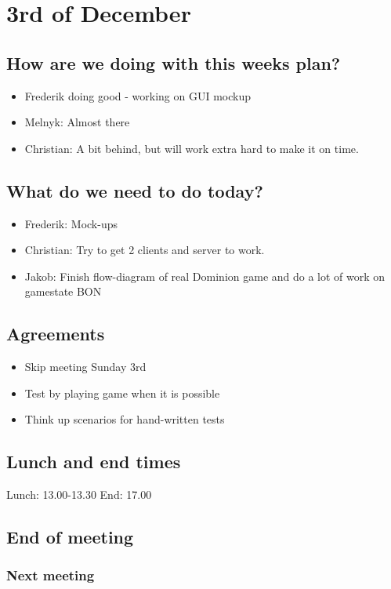 \section{3rd of December}
\subsection{How are we doing with this weeks plan?}
\begin{itemize}
\item  Frederik doing good - working on GUI mockup
\item Melnyk: Almost there
\item Christian: A bit behind, but will work extra hard to make it on time.
\end{itemize}

\subsection{What do we need to do today?}
\begin{itemize}
\item Frederik: Mock-ups
\item Christian: Try to get 2 clients and server to work.
\item Jakob: Finish flow-diagram of real Dominion game and do a lot of work on gamestate BON
\end{itemize}

\subsection{Agreements}
\begin{itemize}
\item Skip meeting Sunday 3rd
\item Test by playing game when it is possible
\item Think up scenarios for hand-written tests
\end{itemize}
\subsection{Lunch and end times}
Lunch:
13.00-13.30
End:
17.00
\subsection{End of meeting}
\subsubsection{Next meeting}
